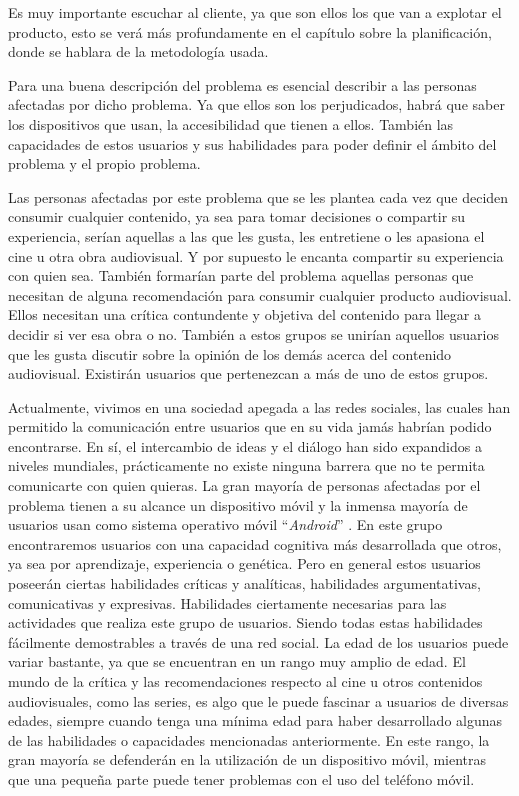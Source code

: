 Es muy importante escuchar al cliente, ya que son ellos los que van a explotar el producto, esto se 
verá más profundamente en el capítulo sobre la planificación, donde se hablara de la metodología usada.

Para una buena descripción del problema es esencial describir a las personas afectadas por dicho 
problema. Ya que ellos son los perjudicados, habrá que saber los dispositivos que usan, la 
accesibilidad que tienen a ellos. También las capacidades de estos usuarios y sus habilidades para 
poder definir el ámbito del problema y el propio problema.

Las personas afectadas por este problema que se les plantea cada vez que deciden consumir cualquier
contenido, ya sea para tomar decisiones o compartir su experiencia, serían aquellas a las que les 
gusta, les entretiene o les apasiona el cine u otra obra audiovisual. Y por supuesto le encanta 
compartir su experiencia con quien sea. También formarían parte del problema aquellas personas que 
necesitan de alguna recomendación para consumir cualquier producto audiovisual. Ellos necesitan una 
crítica contundente y objetiva del contenido para llegar a decidir si ver esa obra o no. También a 
estos grupos se unirían aquellos usuarios que les gusta discutir sobre la opinión de los demás acerca 
del contenido audiovisual. Existirán usuarios que pertenezcan a más de uno de estos grupos.

Actualmente, vivimos en una sociedad apegada a las redes sociales, las cuales han permitido la 
comunicación entre usuarios que en su vida jamás habrían podido encontrarse. En sí, el intercambio de 
ideas y el diálogo han sido expandidos a niveles mundiales, prácticamente no existe ninguna barrera
que no te permita comunicarte con quien quieras. La gran mayoría de personas afectadas por el problema 
tienen a su alcance un dispositivo móvil y la inmensa mayoría de usuarios usan como sistema operativo 
móvil ``\textit{Android}'' \cite{AndrvsIOS}. En este grupo encontraremos usuarios con una capacidad 
cognitiva más desarrollada que otros, ya sea por aprendizaje, experiencia o genética. Pero en general 
estos usuarios poseerán ciertas habilidades críticas y analíticas, habilidades argumentativas, 
comunicativas y expresivas. Habilidades ciertamente necesarias para las actividades que realiza este 
grupo de usuarios. Siendo todas estas habilidades fácilmente demostrables a través de  una red social. 
La edad de los usuarios puede variar bastante, ya que se encuentran en un rango muy amplio de edad. El 
mundo de la crítica y las recomendaciones respecto al cine u otros contenidos audiovisuales, como las 
series, es algo que le puede fascinar a usuarios de diversas edades, siempre cuando tenga una mínima 
edad para haber desarrollado algunas de las habilidades o capacidades mencionadas anteriormente. En
este rango, la gran mayoría se defenderán en la utilización de un dispositivo móvil, mientras que una 
pequeña parte puede tener problemas con el uso del teléfono móvil.

